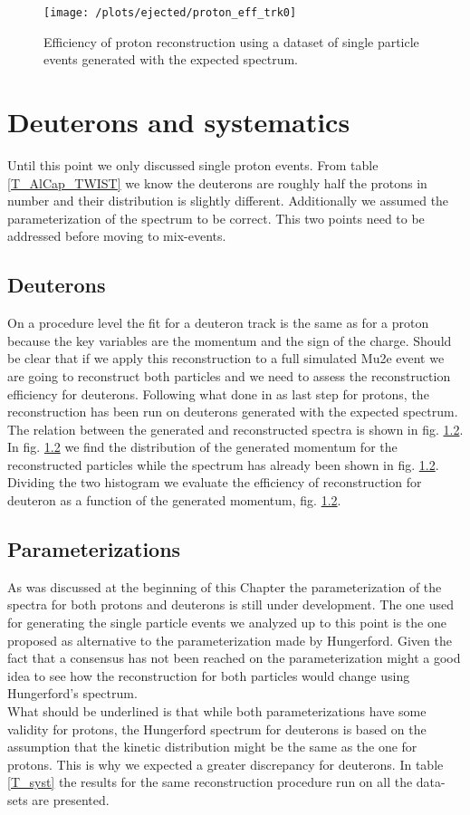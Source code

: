 \documentclass[12pt,a4paper,openright, oneside, titlepage]{book} %
\begin{document}
\begin{figure}[!htb]
\centering
\texttt{[image: /plots/ejected/proton\_eff\_trk0]}
\caption{Efficiency of proton reconstruction using a dataset of single particle events generated with the expected spectrum.}
\label{_proton_eff_trk0}
\end{figure}

\section{Deuterons and systematics}
Until this point we only discussed single proton events. 
From table \ref{T_AlCap_TWIST} we know the deuterons are roughly half the protons in number and their distribution is slightly different.
Additionally we assumed the parameterization of the spectrum to be correct. This two points need to be addressed before moving to mix-events.

\subsection{Deuterons}
On a procedure level the fit for a deuteron track is the same as for a proton because the key variables are the momentum and the sign of the charge.
Should be clear that if we apply this reconstruction to a full simulated Mu2e event we are going to reconstruct both particles and we need to assess the reconstruction efficiency for deuterons. 
Following what done in as last step for protons, the reconstruction has been run on deuterons generated with the expected spectrum. 
The relation between the generated and reconstructed spectra is shown in fig. \ref{}.
In fig. \ref{} we find the distribution of the generated momentum for the reconstructed particles while the spectrum has already been shown in fig. \ref{}. Dividing the two histogram we evaluate the efficiency of reconstruction for deuteron as a function of the generated momentum, fig. \ref{}. 


\subsection{Parameterizations}
As was discussed at the beginning of this Chapter the parameterization of the spectra for both protons and deuterons is still under development. 
The one used for generating the single particle events we analyzed up to this point is the one proposed as alternative to the parameterization made by Hungerford. 
Given the fact that a consensus has not been reached on the parameterization might a good idea to see how the reconstruction for both particles would change using Hungerford's spectrum.\\
What should be underlined is that while both parameterizations have some validity for protons, the Hungerford spectrum for deuterons is based on the assumption that the kinetic distribution might be the same as the one for protons. This is why we expected a greater discrepancy for deuterons. 
In table \ref{T_syst} the results for the same reconstruction procedure run on all the data-sets are presented.\\
\end{document}
